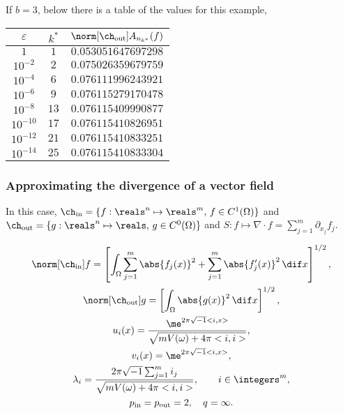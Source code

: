 \documentclass[final]{elsarticle}
\newcommand{\chin}{\ch_{\text{\rm{in}}}}
\newcommand{\chout}{\ch_{\text{\rm{out}}}}
\newcommand{\pin}{p_{\text{\rm{in}}}}
\newcommand{\pout}{p_{\text{\rm{out}}}}
\theoremstyle{definition}
\theoremstyle{remark}
\begin{document}
If $b=3$, below there is a table of the values for this example,
\begin{center}
\begin{tabular}{|c|c|c|}
  \hline
  $\varepsilon$ & $k^*$ & $\norm[\chout]{A_{n_{k^*}}(f)}$ \\
  \hline
  $1$ & $1$ & $0.053051647697298$ \\
  $10^{-2}$ & $2$ & $0.075026359679759$ \\
  $10^{-4}$ & $6$ & $0.076111996243921$ \\
  $10^{-6}$ & $9$ & $0.076115279170478$ \\
  $10^{-8}$ & $13$ & $0.076115409990877$ \\
  $10^{-10}$ & $17$ & $0.076115410826951$ \\
  $10^{-12}$ & $21$ & $0.076115410833251$ \\
  $10^{-14}$ & $25$ & $0.076115410833304$ \\
  \hline
\end{tabular}
\end{center}

\subsubsection{Approximating the divergence of a vector field}

In this case, $\chin=\{f:\reals^n\mapsto\reals^m,\, f\in C^1(\Omega)\}$ and $\chout=\{g:\reals^n\mapsto\reals,\, g\in C^0(\Omega)\}$ and $S: f\mapsto \nabla\cdot f=\sum_{j=1}^{m}\partial_{x_j}f_j$.

\begin{gather*}
\norm[\chin]{f} =\left[\int_\Omega \sum_{j=1}^{m}\abs{f_j(x)}^2+\sum_{j=1}^{m}\abs{f'_j(x)}^2 \, \dif x \right]^{1/2},\\
\norm[\chout]{g} = \left[\int_\Omega \abs{g(x)}^2 \, \dif x \right]^{1/2}, \\
u_{i}(x) = \frac{\me^{2 \pi \sqrt{-1} <i,x>}}{\sqrt{mV(\omega)+4\pi<i,i>}}, \\
v_i(x) = \me^{2 \pi \sqrt{-1} <i,x>},\\
 \lambda_i=\frac{2\pi\sqrt{-1}\sum_{j=1}^{m}i_j}{\sqrt{mV(\omega)+4\pi<i,i>}}, \qquad i \in \integers^m,\\
\pin=\pout=2,\quad q=\infty.
\end{gather*}







\end{document}
